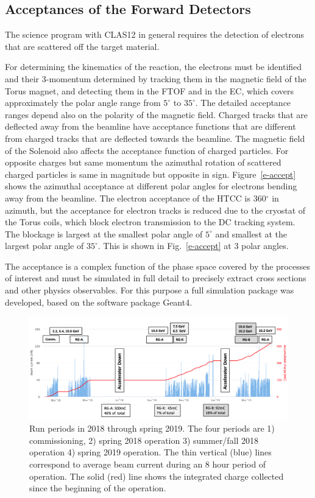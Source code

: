 \documentclass[final,3p,times,twocolumn,authoryear]{elsarticle}
\begin{document}
\subsection{\rm Acceptances of the Forward Detectors} 
The science program with CLAS12 in general requires the detection of electrons that are scattered off the target material. 

For determining the kinematics of the reaction, the electrons must be identified and their 3-momentum determined by tracking
them in the magnetic field of the Torus magnet, and detecting them in the FTOF and in the EC, which covers approximately 
the polar angle range from $5^\circ$ to $35^\circ$. The detailed acceptance ranges depend also on the polarity of the 
magnetic field. Charged tracks that are deflected away from the beamline have acceptance functions
that are different from charged tracks that are deflected towards the beamline. The magnetic field of the Solenoid also affects
the acceptance function of charged particles. For opposite charges but same 
momentum the azimuthal rotation of scattered charged particles is same in magnitude but opposite in sign.  
Figure~\ref{e-accept} shows the azimuthal acceptance at different polar angles for electrons bending away from the beamline.  
The electron acceptance of the HTCC is 360$^\circ$ in azimuth, but the acceptance for electron tracks is reduced due to 
the cryostat of the Torus coils, which block electron transmission to the DC tracking system. The blockage is largest  
at the smallest polar angle of $5^\circ$ and smallest at the largest polar angle of  $35^\circ$. This is shown 
in Fig.~\ref{e-accept} at 3 polar angles.  

The acceptance is a complex function of the phase space covered by the processes of interest and must be simulated in 
full detail to precisely extract cross sections and other physics observables.  For this purpose a full simulation package 
was developed, based on the software package Geant4. 


\begin{figure}[htbp!]
\centerline{\includegraphics[width=1.9\columnwidth]{charges-bw.png}}
\caption{Run periods in 2018 through spring 2019. The four periods are 1) commissioning, 2) spring 2018 operation 3) summer/fall 2018 operation 
4) spring 2019 operation. The thin vertical (blue) lines correspond to average beam current during an 8 hour period of operation. The solid (red) line 
shows the integrated charge collected since the beginning of the operation.}
\label{charges}
\end{figure}
\end{document}
